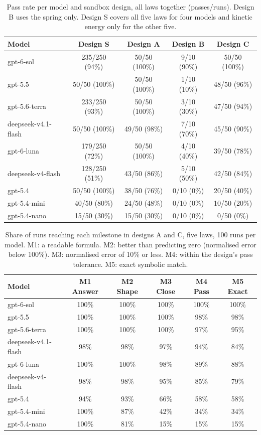 \begin{table}[h]
\centering
\small
\begin{tabular}{lcccc}
\hline
Model & Design S & Design A & Design B & Design C \\
\hline
gpt-6-sol & 235/250 (94\%) & 50/50 (100\%) & 9/10 (90\%) & 50/50 (100\%) \\
gpt-5.5 & 50/50 (100\%) & 50/50 (100\%) & 1/10 (10\%) & 48/50 (96\%) \\
gpt-5.6-terra & 233/250 (93\%) & 50/50 (100\%) & 3/10 (30\%) & 47/50 (94\%) \\
deepseek-v4.1-flash & 50/50 (100\%) & 49/50 (98\%) & 7/10 (70\%) & 45/50 (90\%) \\
gpt-6-luna & 179/250 (72\%) & 50/50 (100\%) & 4/10 (40\%) & 39/50 (78\%) \\
deepseek-v4-flash & 128/250 (51\%) & 43/50 (86\%) & 5/10 (50\%) & 42/50 (84\%) \\
gpt-5.4 & 50/50 (100\%) & 38/50 (76\%) & 0/10 (0\%) & 20/50 (40\%) \\
gpt-5.4-mini & 40/50 (80\%) & 24/50 (48\%) & 0/10 (0\%) & 10/50 (20\%) \\
gpt-5.4-nano & 15/50 (30\%) & 15/50 (30\%) & 0/10 (0\%) & 0/50 (0\%) \\
\hline
\end{tabular}
\caption{Pass rate per model and sandbox design, all laws together (passes/runs). Design B uses the spring only. Design S covers all five laws for four models and kinetic energy only for the other five.}
\label{tab:passdesign}
\end{table}

\begin{table}[h]
\centering
\small
\begin{tabular}{lccccc}
\hline
Model & M1 Answer & M2 Shape & M3 Close & M4 Pass & M5 Exact \\
\hline
gpt-6-sol & 100\% & 100\% & 100\% & 100\% & 100\% \\
gpt-5.5 & 100\% & 100\% & 100\% & 98\% & 98\% \\
gpt-5.6-terra & 100\% & 100\% & 100\% & 97\% & 95\% \\
deepseek-v4.1-flash & 98\% & 98\% & 97\% & 94\% & 84\% \\
gpt-6-luna & 100\% & 100\% & 98\% & 89\% & 88\% \\
deepseek-v4-flash & 98\% & 98\% & 95\% & 85\% & 79\% \\
gpt-5.4 & 94\% & 93\% & 66\% & 58\% & 58\% \\
gpt-5.4-mini & 100\% & 87\% & 42\% & 34\% & 34\% \\
gpt-5.4-nano & 100\% & 81\% & 15\% & 15\% & 15\% \\
\hline
\end{tabular}
\caption{Share of runs reaching each milestone in designs A and C, five laws, 100 runs per model. M1: a readable formula. M2: better than predicting zero (normalised error below 100\%). M3: normalised error of 10\% or less. M4: within the design's pass tolerance. M5: exact symbolic match.}
\label{tab:milestones}
\end{table}
